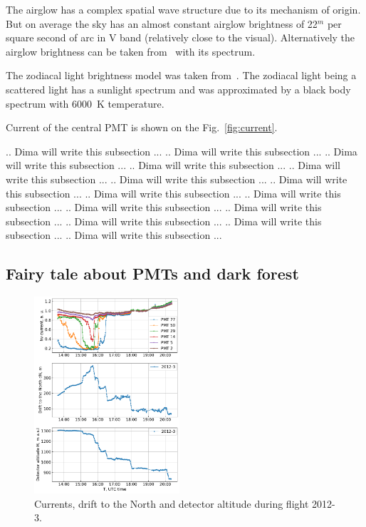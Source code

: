 \documentclass[final,5p,times,twocolumn]{elsarticle}
\begin{document}
The airglow has a complex spatial wave structure due to its mechanism of origin. But on average the sky has an almost constant airglow brightness of 22$^m$ per square second of arc in V band (relatively close to the visual). Alternatively the airglow brightness can be taken from~\cite{KRASSOVSKY1962883} with its spectrum.

The zodiacal light brightness model was taken from~\cite{BUFFINGTON201688}. The zodiacal light being a scattered light has a sunlight spectrum and was approximated by a black body spectrum with 6000~K temperature.



Current of the central PMT is shown on the Fig.~\ref{fig:current}. 

.. Dima will write this subsection ...
.. Dima will write this subsection ...
.. Dima will write this subsection ...
.. Dima will write this subsection ...
.. Dima will write this subsection ...
.. Dima will write this subsection ...
.. Dima will write this subsection ...
.. Dima will write this subsection ...
.. Dima will write this subsection ...
.. Dima will write this subsection ...
.. Dima will write this subsection ...
.. Dima will write this subsection ...
.. Dima will write this subsection ...
.. Dima will write this subsection ...



\subsection{Fairy tale about PMTs and dark forest}

\begin{figure}[t]
    \includegraphics[width=0.48\textwidth]{figs/2012-3_currents_H_dN.pdf}
    \caption{Currents, drift to the North and detector altitude during flight 2012-3.}
    \label{fig:2012-3_currents}
\end{figure}
\end{document}
